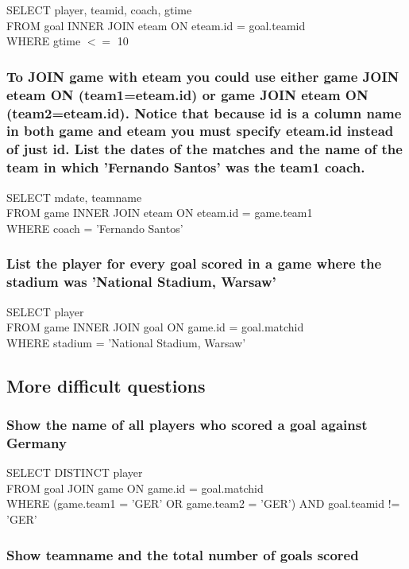\documentclass[10pt, oneside]{article}
\begin{document}
SELECT player, teamid, coach, gtime \\
FROM goal INNER JOIN eteam ON eteam.id = goal.teamid\\
WHERE gtime $<=$ 10\\

\subsubsection{To JOIN game with eteam you could use either game JOIN eteam ON (team1=eteam.id) or game JOIN eteam ON (team2=eteam.id). Notice that because id is a column name in both game and eteam you must specify eteam.id instead of just id. List the dates of the matches and the name of the team in which 'Fernando Santos' was the team1 coach.}

SELECT mdate, teamname\\
FROM game INNER JOIN eteam ON eteam.id = game.team1\\
WHERE coach = 'Fernando Santos'\\

\subsubsection{List the player for every goal scored in a game where the stadium was 'National Stadium, Warsaw'}

SELECT player\\
FROM game INNER JOIN goal ON game.id = goal.matchid\\
WHERE stadium = 'National Stadium, Warsaw'\\

\subsection{More difficult questions}

\subsubsection{Show the name of all players who scored a goal against Germany}

SELECT DISTINCT player \\
FROM goal JOIN game ON game.id = goal.matchid \\
WHERE (game.team1 = 'GER' OR game.team2 = 'GER') AND goal.teamid != 'GER' \\

\subsubsection{Show teamname and the total number of goals scored}
\end{document}
